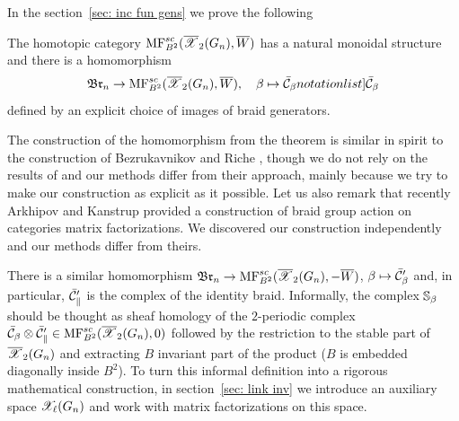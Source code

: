 \documentclass[10pt]{amsart}
\begin{document}
  In the section~\ref{sec: inc fun gens} we prove the following

\begin{theorem}\label{thm: braid realization} The homotopic category $\mathrm{MF}^{sc}_{B^2}(\overline{\mathscr{X}}_2(G_n),\overline{W})$ has a natural monoidal structure and there is a homomorphism
$$  \Brgr_n\to  \MF_{B^2}(\calXr_2(G_n),\Wr),\quad \beta\mapsto \SymbolPrint{\bcalC_\beta}$$
defined by an explicit choice of images of braid generators.
\end{theorem}


The construction of the homomorphism from the theorem is similar in spirit to the construction of Bezrukavnikov and Riche \cite{BR},
though we do not rely on the results of \cite{BR}
and
our methods differ from their approach, mainly because we try to make our construction as explicit as it possible. Let us also remark that recently Arkhipov and Kanstrup %
\cite{AK}
provided
a construction of braid group   action on  categories matrix factorizations. We discovered our construction  independently and  our methods differ from theirs.


There is a similar homomorphism $\mathfrak{Br}_n\to \mathrm{MF}^{sc}_{B^2}(\overline{\mathscr{X}}_2(G_n),-\overline{W})$, $ \beta\mapsto \bar{\mathcal{C}}'_\beta$  and, in particular, $\bar{\mathcal{C}}'_\parallel$ is the complex of the identity braid.
Informally, the complex $\mathbb{S}_\beta$ should be thought as sheaf homology of the $2$-periodic complex $\bar{\mathcal{C}}_\beta\otimes \bar{\mathcal{C}}'_\parallel\in \mathrm{MF}^{sc}_{B^2}(\overline{\mathscr{X}}_2(G_n),0)$ followed by the
restriction to the stable part of $\overline{\mathscr{X}}_2(G_n)$ and extracting $B$ invariant part of the product ($B$ is embedded diagonally inside $B^2$).
To turn this informal definition into a rigorous mathematical construction, in section~\ref{sec: link inv} we introduce an auxiliary space $\mathscr{X}_\ell(G_n)$ and
work with matrix factorizations on this space.


%
\end{document}
